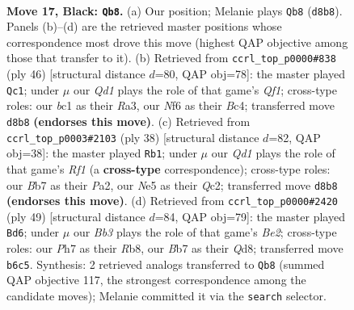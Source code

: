 \documentclass[11pt]{article}
\begin{document}
\clearpage

\begin{figure}[p]\centering
\begin{subfigure}{0.46\textwidth}\centering
\resizebox{\linewidth}{!}{%
\newchessgame
\chessboard[
  setfen={r2q4/1bp1k1pp/1b1p1n2/1p2n3/pP2P3/N1P5/P1Q2PPP/R1B1RK2 b - - 1 17},
  showmover=false,
  pgfstyle=straightmove, color=movearrow, markmove={d8-b8}
]}
\caption{}
\end{subfigure}\hfill
\begin{subfigure}{0.46\textwidth}\centering
\resizebox{\linewidth}{!}{%
\newchessgame
\chessboard[
  setfen={3q1bk1/r4p2/p2p1npp/P1pP1b2/2B5/R1N4P/1P1B1PP1/5QK1 w - - 3 24},
  showmover=false,
  pgfstyle=straightmove, color=movearrow, markmove={f1-c1}
]}
\caption{}
\end{subfigure}
\\[4pt]
\begin{subfigure}{0.46\textwidth}\centering
\resizebox{\linewidth}{!}{%
\newchessgame
\chessboard[
  setfen={2br2k1/p3q1bp/1p2p1p1/nB6/2p1PN2/2P1B1P1/P1Q2P1P/5RK1 w - - 0 20},
  showmover=false,
  pgfstyle=straightmove, color=movearrow, markmove={f1-b1}
]}
\caption{}
\end{subfigure}\hfill
\begin{subfigure}{0.46\textwidth}\centering
\resizebox{\linewidth}{!}{%
\newchessgame
\chessboard[
  setfen={1r1q2k1/2r1bpp1/5n1p/1p1PpP2/bP2P3/3B3P/NR2QBPK/5R2 b - - 1 25},
  showmover=false,
  pgfstyle=straightmove, color=movearrow, markmove={e7-d6}
]}
\caption{}
\end{subfigure}
\caption{\textbf{Move 17, Black: \texttt{Qb8}.} (a) Our position; Melanie plays \texttt{Qb8} (\texttt{d8b8}). Panels (b)--(d) are the retrieved master positions whose correspondence most drove this move (highest QAP objective among those that transfer to it). (b) Retrieved from \texttt{ccrl\_top\_p0000\#838} (ply 46) [structural distance $d$=80, QAP obj=78]: the master played \texttt{Qc1}; under $\mu$ our \emph{Qd1} plays the role of that game's \emph{Qf1}; cross-type roles: our \emph{b}c1 as their \emph{R}a3, our \emph{N}f6 as their \emph{B}c4; transferred move \texttt{d8b8} \textbf{(endorses this move)}. (c) Retrieved from \texttt{ccrl\_top\_p0003\#2103} (ply 38) [structural distance $d$=82, QAP obj=38]: the master played \texttt{Rb1}; under $\mu$ our \emph{Qd1} plays the role of that game's \emph{Rf1} (a \textbf{cross-type} correspondence); cross-type roles: our \emph{B}b7 as their \emph{P}a2, our \emph{N}e5 as their \emph{Q}c2; transferred move \texttt{d8b8} \textbf{(endorses this move)}. (d) Retrieved from \texttt{ccrl\_top\_p0000\#2420} (ply 49) [structural distance $d$=84, QAP obj=79]: the master played \texttt{Bd6}; under $\mu$ our \emph{Bb3} plays the role of that game's \emph{Be2}; cross-type roles: our \emph{P}h7 as their \emph{R}b8, our \emph{B}b7 as their \emph{Q}d8; transferred move \texttt{b6c5}. Synthesis: 2 retrieved analogs transferred to \texttt{Qb8} (summed QAP objective 117, the strongest correspondence among the candidate moves); Melanie committed it via the \texttt{search} selector.}
\label{fig:thought-m33}
\end{figure}
\end{document}
